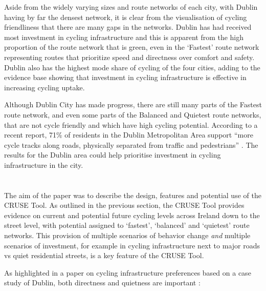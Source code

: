 \documentclass[
  super,
  preprint,
  3p]{elsarticle}
\providecommand{\DIFadd}[1]{{\protect\color{blue}\uwave{#1}}} %
\providecommand{\DIFaddbegin}{} %
\providecommand{\DIFaddend}{} %
\providecommand{\DIFdelbegin}{} %
\providecommand{\DIFdelend}{} %
\newcommand{\DIFscaledelfig}{0.5}
\newlength{\DIFdelgraphicswidth} %
\newlength{\DIFdelgraphicsheight} %
\newcommand{\DIFaddincludegraphics}[2][]{{\color{blue}\fbox{\DIFOincludegraphics[#1]{#2}}}} %
\newcommand{\DIFdelincludegraphics}[2][]{%
\sbox{\DIFdelgraphicsbox}{\DIFOincludegraphics[#1]{#2}}%
\settoboxwidth{\DIFdelgraphicswidth}{\DIFdelgraphicsbox} %
\settoboxtotalheight{\DIFdelgraphicsheight}{\DIFdelgraphicsbox} %
\scalebox{\DIFscaledelfig}{%
\parbox[b]{\DIFdelgraphicswidth}{\usebox{\DIFdelgraphicsbox}\\[-\baselineskip] \rule{\DIFdelgraphicswidth}{0em}}\llap{\resizebox{\DIFdelgraphicswidth}{\DIFdelgraphicsheight}{%
\setlength{\unitlength}{\DIFdelgraphicswidth}%
\begin{picture}(1,1)%
\thicklines\linethickness{2pt} %
{\color[rgb]{1,0,0}\put(0,0){\framebox(1,1){}}}%
{\color[rgb]{1,0,0}\put(0,0){\line( 1,1){1}}}%
{\color[rgb]{1,0,0}\put(0,1){\line(1,-1){1}}}%
\end{picture}%
}\hspace*{3pt}}} %
} %
\DeclareRobustCommand{\DIFaddbegin}{\DIFOaddbegin \let\includegraphics\DIFaddincludegraphics} %
\DeclareRobustCommand{\DIFaddend}{\DIFOaddend \let\includegraphics\DIFOincludegraphics} %
\DeclareRobustCommand{\DIFdelbegin}{\DIFOdelbegin \let\includegraphics\DIFdelincludegraphics} %
\DeclareRobustCommand{\DIFdelend}{\DIFOaddend \let\includegraphics\DIFOincludegraphics} %
\begin{document}
Aside from the widely varying sizes and route networks of each city,
with Dublin having by far the densest network, it is clear from the
visualisation of cycling friendliness that there are many gaps in the
networks. Dublin has had received most investment in cycling
infrastructure and this is apparent from the high proportion of the
route network that is green, even in the `Fastest' route network
representing routes that prioritize speed and directness over comfort
and safety. Dublin also has the highest mode share of cycling of the
four cities, adding to the evidence base showing that investment in
cycling infrastructure is effective in increasing cycling uptake.

Although Dublin City has made progress, there are still many parts of
the Fastest route network, and even some parts of the Balanced and
Quietest route networks, that are not cycle friendly and which have high
cycling potential. According to a recent report, 71\% of residents in
the Dublin Metropolitan Area support ``more cycle tracks along roads,
physically separated from traffic and pedestrians'' \citep{walking2021}.
The results for the Dublin area could help prioritise investment in
cycling infrastructure in the city.

\DIFdelbegin %
\DIFdelend \DIFaddbegin \section{\DIFadd{Discussion}}\label{sec-discussion}
\DIFaddend 

The aim of the paper was to describe the design, features and potential
use of the CRUSE Tool. As outlined in the previous section, the CRUSE
Tool provides evidence on current and potential future cycling levels
across Ireland down to the street level, with potential assigned to
`fastest', `balanced' and `quietest' route networks. This provision of
multiple scenarios of behavior change \emph{and} multiple scenarios of
investment, for example in cycling infrastructure next to major roads vs
quiet residential streets, is a key feature of the CRUSE Tool.

As highlighted in a paper on cycling infrastructure preferences based on
a case study of Dublin, both directness and quietness are important
\citep{caulfield2012}:
\end{document}
